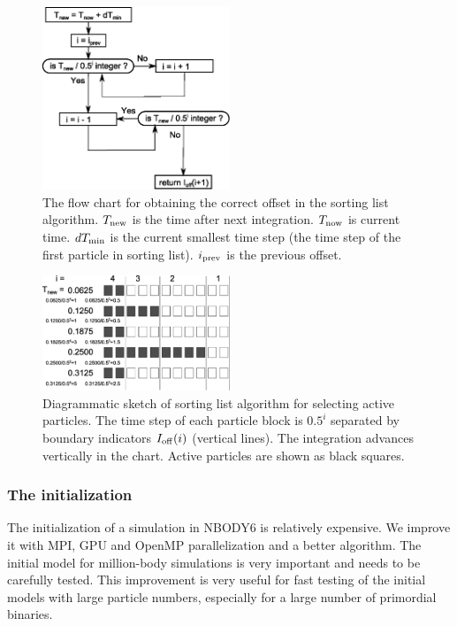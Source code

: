 \documentclass[usenatbib,aas_macros]{mn2e}
\def\nbody{NBODY6 }
\begin{document}
\begin{figure}
  \centering
  \includegraphics[width=0.5\textwidth,height=!]{sorting_flowchart.eps}
  \caption{The flow chart for obtaining the correct offset in the sorting list algorithm. 
    $T_{\rm new}$ is the time after next integration. $T_{\rm now}$ is current time. $dT_{\rm min}$ is the current smallest time step (the time step of the first particle in sorting list).
    $i_{\rm prev}$ is the previous offset. }
  \label{fig:sortchart}
\end{figure}

\begin{figure}
  \centering
  \includegraphics[width=0.5\textwidth,height=!]{sorting_step.eps}
  \caption{Diagrammatic sketch of sorting list algorithm for selecting active particles. 
    The time step of each particle block is $0.5^i$ separated by boundary indicators $I_{\rm off}(i)$ (vertical lines).
    The integration advances vertically in the chart. Active particles are shown as black squares.}
  \label{fig:sortlist}
\end{figure}

\subsubsection{ The initialization }
\label{sec:init}

The initialization of a simulation in \nbody is relatively expensive. 
We improve it with MPI, GPU and OpenMP parallelization and a better algorithm.
The initial model for million-body simulations is very important and needs to be carefully tested.
This improvement is very useful for fast testing of the initial models with large particle numbers, especially for a large number of primordial binaries.
\end{document}
